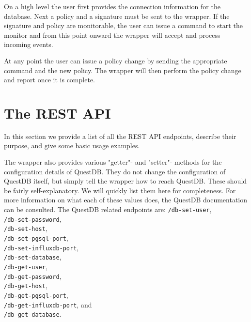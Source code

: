 On a high level the user first provides the connection information for the database.
Next a policy and a signature must be sent to the wrapper.
If the signature and policy are monitorable, the user can issue a command to start the monitor and from this point onward the wrapper will accept and process incoming events.

At any point the user can issue a policy change by sending the appropriate command and the new policy.
The wrapper will then perform the policy change and report once it is complete.

\section{The REST API}

In this section we provide a list of all the REST API endpoints, describe their purpose, and give some basic usage examples.



The wrapper also provides various "getter"- and "setter"- methods for the configuration details of QuestDB.
They do not change the configuration of QuestDB itself, but simply tell the wrapper how to reach QuestDB.
These should be fairly self-explanatory.
We will quickly list them here for completeness. 
For more information on what each of these values does, the QuestDB documentation \cite{questdb,questdb-postgres-wire,questdb-influx-db-line-protocol} can be consulted.
The QuestDB related endpoints are:
\texttt{/db-set-user}, \\
\texttt{/db-set-password}, \\
\texttt{/db-set-host}, \\
\texttt{/db-set-pgsql-port}, \\
\texttt{/db-set-influxdb-port}, \\
\texttt{/db-set-database}, \\
\texttt{/db-get-user}, \\
\texttt{/db-get-password}, \\
\texttt{/db-get-host}, \\
\texttt{/db-get-pgsql-port},\\
\texttt{/db-get-influxdb-port}, and \\
\texttt{/db-get-database}.






